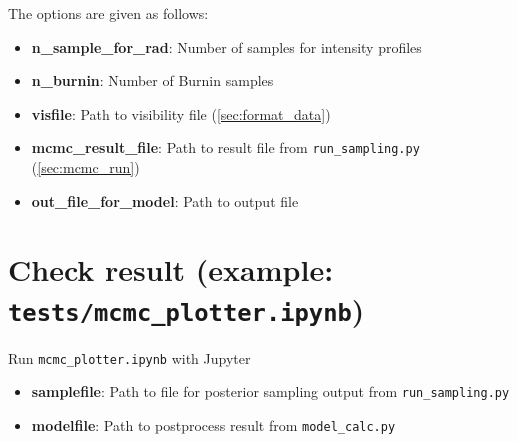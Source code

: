 \documentclass{report}
\begin{document}
The options are given as follows: 

\begin{itemize}
    \item \textbf{n\_sample\_for\_rad}: Number of samples for intensity profiles
    \item \textbf{n\_burnin}: Number of Burnin samples
    \item \textbf{visfile}: Path to visibility file (\ref{sec:format_data})
    \item \textbf{mcmc\_result\_file}: Path to result file from \texttt{run\_sampling.py} (\ref{sec:mcmc_run})
    \item \textbf{out\_file\_for\_model}: Path to output file 
\end{itemize}

\section{Check result (example: \texttt{tests/mcmc\_plotter.ipynb})}
Run \texttt{mcmc\_plotter.ipynb} with Jupyter
    \begin{itemize}
        \item \textbf{samplefile}: Path to file for posterior sampling output from \texttt{run\_sampling.py}
        \item \textbf{modelfile}: Path to postprocess result from \texttt{model\_calc.py}
    \end{itemize}


\end{document}
